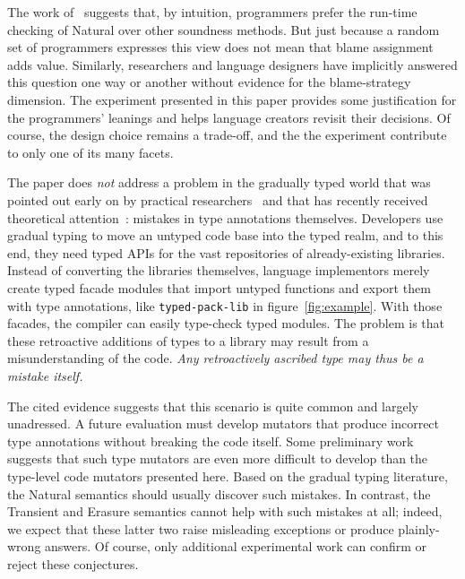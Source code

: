 
The work of~\citet{tgpk-dls-2018} suggests that, by intuition, programmers
prefer the run-time checking of Natural over other soundness methods. But just
because a random set of programmers expresses this view does not mean that blame
assignment adds value. Similarly, researchers and language designers have
implicitly answered this question one way or another without evidence for the
blame-strategy dimension. The experiment presented in this paper provides some
justification for the programmers' leanings and helps language creators revisit
their decisions. Of course, the design choice remains a trade-off, and the
the experiment contribute to only one of its many facets. 

The paper does {\em not\/} address a problem in the gradually typed world that
was pointed out early on by practical researchers~\citep{incorrect-ts,
sta-nt-base-types, wmwz-ecoop-2017} and that has recently received theoretical
attention~\citep{gfd-oopsla-2019, cc-oopsla-20}: mistakes in type annotations
themselves.  Developers use gradual typing to move an untyped code base into the
typed realm, and to this end, they need typed APIs for the vast repositories of
already-existing libraries. Instead of converting the libraries themselves,
language implementors merely create typed facade modules that import untyped
functions and export them with type annotations, like {\tt typed-pack-lib} in
figure~\ref{fig:example}.  With those facades, the compiler can easily
type-check typed modules. The problem is that these retroactive additions of
types to a library may result from a misunderstanding of the code. \emph{Any
retroactively ascribed type may thus be a mistake itself.}

The cited evidence suggests that this scenario is quite common and largely
unadressed.  A future evaluation must develop mutators that produce incorrect
type annotations without breaking the code itself. Some preliminary work
suggests that such type mutators are even more difficult to develop than the
type-level code mutators presented here. Based on the gradual typing literature,
the Natural semantics should usually discover such mistakes. In contrast, the
Transient and Erasure semantics cannot help with such mistakes at all; indeed,
we expect that these latter two raise misleading exceptions or produce
plainly-wrong answers.  Of course, only additional experimental work can confirm
or reject these conjectures.



